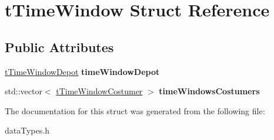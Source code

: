 \hypertarget{structt_time_window}{
\section{tTimeWindow Struct Reference}
\label{structt_time_window}
}
\subsection*{Public Attributes}
\begin{DoxyCompactItemize}
\item 
\hypertarget{structt_time_window_a9a2ec6b368443b88a9dc4f0d2fbc8f3a}{
\hyperlink{structt_time_window_depot}{tTimeWindowDepot} {\bfseries timeWindowDepot}}
\label{structt_time_window_a9a2ec6b368443b88a9dc4f0d2fbc8f3a}

\item 
\hypertarget{structt_time_window_ab518101778506a73d15438b2412ad1f9}{
std::vector$<$ \hyperlink{structt_time_window_costumer}{tTimeWindowCostumer} $>$ {\bfseries timeWindowsCostumers}}
\label{structt_time_window_ab518101778506a73d15438b2412ad1f9}

\end{DoxyCompactItemize}


The documentation for this struct was generated from the following file:\begin{DoxyCompactItemize}
\item 
dataTypes.h\end{DoxyCompactItemize}
